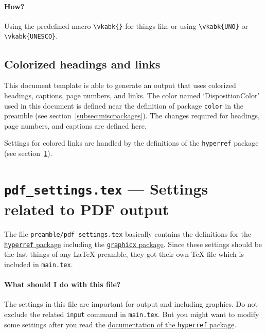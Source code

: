 \paragraph{How?} Using the predefined macro \verb#\vkabk{}# for things like
 or  using \verb#\vkabk{UNO}# or \verb#\vkabk{UNESCO}#.


\subsection{Colorized headings and links}

This document template is able to generate an output that uses colorized
headings, captions, page numbers, and links. The color named `DispositionColor'
used in this document is defined near the definition of package \texttt{color}
in the preamble (see section~\ref{subsec:miscpackages}). The changes required
for headings, page numbers, and captions are defined here.

Settings for colored links are handled by the definitions of the
\texttt{hyperref} package (see section~\ref{sec:pdf}).

\section{\texttt{pdf\_settings.tex} --- Settings related to PDF output}
\label{sec:pdf}

The file \verb#preamble/pdf_settings.tex# basically contains the definitions for
the \href{http://tug.org/applications/hyperref/}{\texttt{hyperref} package}
including the
\href{http://www.ctan.org/tex-archive/macros/latex/required/graphics/}{\texttt{graphicx}
package}. Since these settings should be the last things of any \LaTeX{}
preamble, they got their own \TeX{} file which is included in \texttt{main.tex}.

\paragraph{What should I do with this file?} The settings in this file are
important for  output and including graphics. Do not exclude the
related \texttt{input} command in \texttt{main.tex}. But you might want to
modify some settings after you read the
\href{http://tug.org/applications/hyperref/}{documentation of the \texttt{hyperref} package}.


